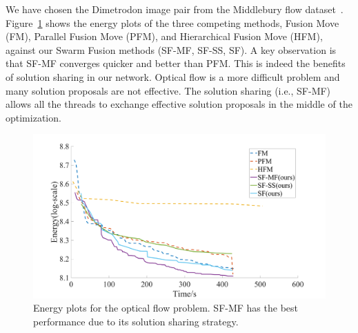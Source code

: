 
\noindent
%
We have chosen the Dimetrodon image pair from the Middlebury flow
dataset~\cite{middlebury_optical_flow}. Figure~\ref{fig:optical_flow_convergence}
shows the energy plots of the three competing methods, Fusion Move
(FM), Parallel Fusion Move (PFM), and Hierarchical Fusion Move (HFM),
against our Swarm Fusion methods (SF-MF, SF-SS, SF). A key observation
is that SF-MF converges quicker and better than PFM. This is indeed the
benefits of solution sharing in our network. Optical flow is a more
difficult problem and many solution proposals are not effective.
The solution sharing (i.e., SF-MF) allows all the threads to exchange
effective solution proposals in the middle of the
optimization.

\begin{figure}[!ht]
  \centering
  \includegraphics[width=0.8\columnwidth]{figure/optical_flow_convergence.png}
  \caption{Energy plots for the optical flow problem. SF-MF has the best
    performance due to its solution sharing strategy.}\label{fig:optical_flow_convergence}
\end{figure}

